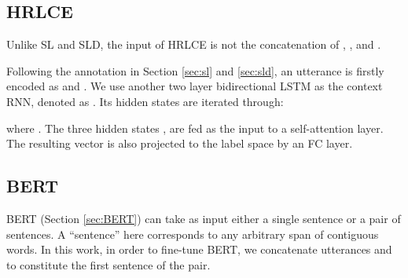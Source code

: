 \documentclass[11pt,a4paper]{article}
\begin{document}
\begin{table}[]
\centering
\caption{Macro-F1 scores and its harmonic means of the four models}
\label{tab:results}
\end{table}

\subsection{HRLCE}
\label{sec:hrlce}
Unlike SL and SLD, the input of HRLCE is not the concatenation of , , and . 

Following the annotation in Section \ref{sec:sl} and \ref{sec:sld}, an utterance  is firstly encoded as  and . We use another two layer bidirectional LSTM as the context RNN, denoted as . Its hidden states are iterated through:



where . The three hidden states , are fed as the input to a self-attention layer. The resulting vector  is also projected to the label space by an FC layer.

\subsection{BERT} 
BERT (Section \ref{sec:BERT}) can take as input either a single sentence or a pair of sentences. A ``sentence'' here corresponds to any arbitrary span of contiguous words.
In this work, in order to fine-tune 
BERT, 
we concatenate utterances  and  to constitute 
the first sentence of the pair.
 
\end{document}
